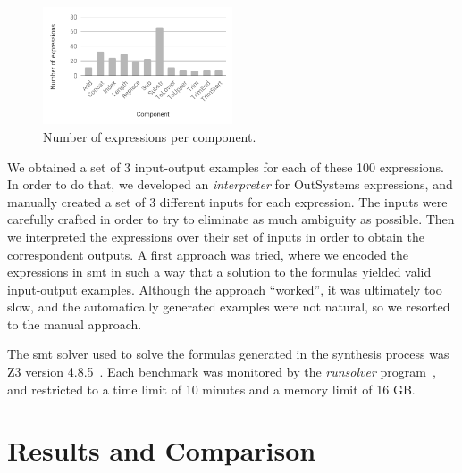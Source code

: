 \begin{figure}
  \centering
  \includegraphics[width=0.5\textwidth]{assets/bar-chart-components-freq-95.pdf}
  \caption{Number of expressions per component.}
  \label{fig:bar-chart-components-freq-95}
\end{figure}

We obtained a set of 3 input-output examples for each of these 100 expressions.
In order to do that, we developed an \textit{interpreter} for OutSystems
expressions, and manually created a set of 3 different inputs for each
expression.
The inputs were carefully crafted in order to try to eliminate as much ambiguity
as possible.
Then we interpreted the expressions over their set of inputs in order to
obtain the correspondent outputs.
A first approach was tried, where we encoded the expressions in \gls{smt} in
such a way that a solution to the formulas yielded valid input-output examples.
Although the approach ``worked'', it was ultimately too slow, and the
automatically generated examples were not natural, so we resorted to the manual
approach.

The \gls{smt} solver used to solve the formulas generated in the synthesis
process was Z3 version 4.8.5~\cite{DeMoura:2008:ZES}.
Each benchmark was monitored by the \textit{runsolver}
program~\cite{Roussel:2011:JSAT}, and restricted to a time limit of 10 minutes
and a memory limit of 16 GB.



\section{Results and Comparison}
\label{sec:results-and-comparison}



